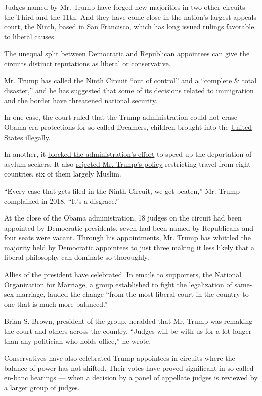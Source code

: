 Judges named by Mr. Trump have forged new majorities in two other
circuits --- the Third and the 11th. And they have come close in the
nation's largest appeals court, the Ninth, based in San Francisco, which
has long issued rulings favorable to liberal causes.

The unequal split between Democratic and Republican appointees can give
the circuits distinct reputations as liberal or conservative.

Mr. Trump has called the Ninth Circuit ``out of control'' and a
``complete \& total disaster,'' and he has suggested that some of its
decisions related to immigration and the border have threatened national
security.

In one case, the court ruled that the Trump administration could not
erase Obama-era protections for so-called Dreamers, children brought
into the
\href{https://www.nytimes3xbfgragh.onion/2018/11/08/us/daca-dreamers-9th-circuit.html}{United
States illegally}.

In another, it
\href{https://www.nytimes3xbfgragh.onion/2019/03/07/us/asylum-seekers-ninth-circuit.html}{blocked
the administration's effort} to speed up the deportation of asylum
seekers. It also
\href{https://www.nytimes3xbfgragh.onion/2017/12/22/us/travel-ban-court.html}{rejected
Mr. Trump's policy} restricting travel from eight countries, six of them
largely Muslim.

``Every case that gets filed in the Ninth Circuit, we get beaten,'' Mr.
Trump complained in 2018. ``It's a disgrace.''

At the close of the Obama administration, 18 judges on the circuit had
been appointed by Democratic presidents, seven had been named by
Republicans and four seats were vacant. Through his appointments, Mr.
Trump has whittled the majority held by Democratic appointees to just
three making it less likely that a liberal philosophy can dominate so
thoroughly.

Allies of the president have celebrated. In emails to supporters, the
National Organization for Marriage, a group established to fight the
legalization of same-sex marriage, lauded the change ``from the most
liberal court in the country to one that is much more balanced.''

Brian S. Brown, president of the group, heralded that Mr. Trump was
remaking the court and others across the country. ``Judges will be with
us for a lot longer than any politician who holds office,'' he wrote.

Conservatives have also celebrated Trump appointees in circuits where
the balance of power has not shifted. Their votes have proved
significant in so-called en-banc hearings --- when a decision by a panel
of appellate judges is reviewed by a larger group of judges.

